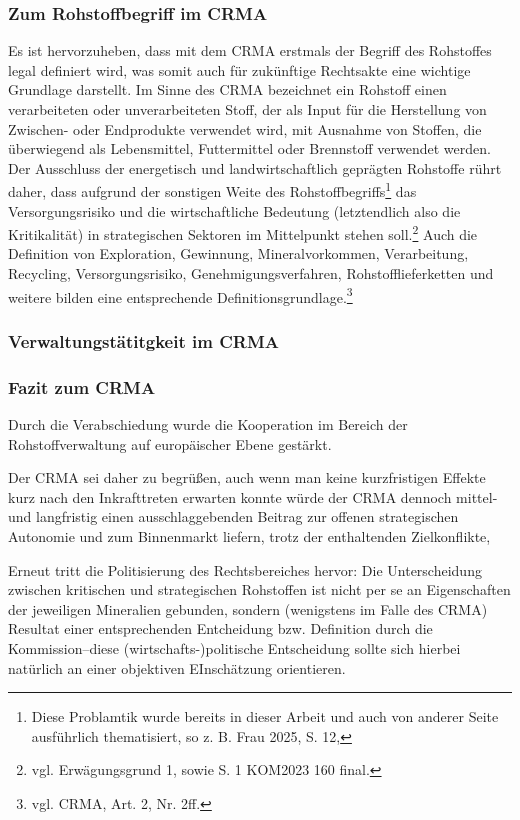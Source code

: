 \documentclass[12pt,a4paper,oneside]{book} %
\begin{document}
	\subsubsection{Zum Rohstoffbegriff im CRMA}
	Es ist hervorzuheben, dass mit dem CRMA erstmals der Begriff des Rohstoffes legal definiert wird, was somit auch für zukünftige Rechtsakte eine wichtige Grundlage darstellt. Im Sinne des CRMA bezeichnet ein Rohstoff \glqq einen verarbeiteten oder unverarbeiteten Stoff, der als Input für die Herstellung von Zwischen- oder Endprodukte verwendet wird, mit Ausnahme von Stoffen, die überwiegend als Lebensmittel, Futtermittel oder Brennstoff verwendet werden\grqq. Der Ausschluss der energetisch und landwirtschaftlich geprägten Rohstoffe rührt daher, dass aufgrund der sonstigen Weite des Rohstoffbegriffs\footnote{Diese Problamtik wurde bereits in dieser Arbeit und auch von anderer Seite ausführlich thematisiert, so z. B. Frau 2025, S. 12, } das Versorgungsrisiko und die wirtschaftliche Bedeutung (letztendlich also die \glqq Kritikalität\grqq) in strategischen Sektoren im Mittelpunkt stehen soll.\footnote{vgl. Erwägungsgrund 1, sowie S. 1 KOM2023 160 final.}
	Auch die Definition von Exploration, Gewinnung, Mineralvorkommen, Verarbeitung, Recycling, Versorgungsrisiko, Genehmigungsverfahren, Rohstofflieferketten und weitere bilden eine entsprechende Definitionsgrundlage.\footnote{vgl. CRMA, Art. 2, Nr. 2ff.}
	
	\subsubsection{Verwaltungstätitgkeit im CRMA}
	
	
	
	\subsubsection{Fazit zum CRMA}
	Durch die Verabschiedung wurde die Kooperation im Bereich der Rohstoffverwaltung auf europäischer Ebene gestärkt.
	
	Der CRMA sei daher zu begrüßen, auch wenn man keine kurzfristigen Effekte kurz nach den Inkrafttreten erwarten konnte würde der CRMA dennoch mittel- und langfristig einen ausschlaggebenden Beitrag zur offenen strategischen Autonomie und zum Binnenmarkt liefern, trotz der enthaltenden Zielkonflikte,\autocite{Schäffer/Hach, ZRP 2023, 210f.}
	
	Erneut tritt die Politisierung des Rechtsbereiches hervor: Die Unterscheidung zwischen kritischen und strategischen Rohstoffen ist nicht per se an Eigenschaften der jeweiligen Mineralien gebunden, sondern (wenigstens im Falle des CRMA) Resultat einer entsprechenden Entcheidung bzw. Definition durch die Kommission--diese (wirtschafts-)politische Entscheidung sollte sich hierbei natürlich an einer objektiven EInschätzung orientieren.\autocite{Frau 2024, NVwZ, 1874, 1876}
	
\end{document}
